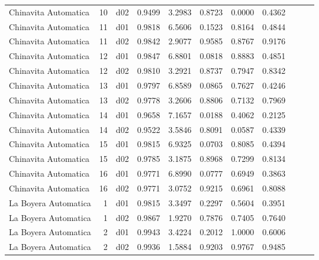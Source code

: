 \begin{landscape}
\begin{longtable}{p{2cm}rrrrrrrrrr}
 Chinavita Automatica  &         10 &     d02 &   0.9499 &  3.2983 &        0.8723 &           0.0000 &  0.4362 \\
 Chinavita Automatica  &         11 &     d01 &   0.9818 &  6.5606 &        0.1523 &           0.8164 &  0.4844 \\
 Chinavita Automatica  &         11 &     d02 &   0.9842 &  2.9077 &        0.9585 &           0.8767 &  0.9176 \\
 Chinavita Automatica  &         12 &     d01 &   0.9847 &  6.8801 &        0.0818 &           0.8883 &  0.4851 \\
 Chinavita Automatica  &         12 &     d02 &   0.9810 &  3.2921 &        0.8737 &           0.7947 &  0.8342 \\
 Chinavita Automatica  &         13 &     d01 &   0.9797 &  6.8589 &        0.0865 &           0.7627 &  0.4246 \\
 Chinavita Automatica  &         13 &     d02 &   0.9778 &  3.2606 &        0.8806 &           0.7132 &  0.7969 \\
 Chinavita Automatica  &         14 &     d01 &   0.9658 &  7.1657 &        0.0188 &           0.4062 &  0.2125 \\
 Chinavita Automatica  &         14 &     d02 &   0.9522 &  3.5846 &        0.8091 &           0.0587 &  0.4339 \\
 Chinavita Automatica  &         15 &     d01 &   0.9815 &  6.9325 &        0.0703 &           0.8085 &  0.4394 \\
 Chinavita Automatica  &         15 &     d02 &   0.9785 &  3.1875 &        0.8968 &           0.7299 &  0.8134 \\
 Chinavita Automatica  &         16 &     d01 &   0.9771 &  6.8990 &        0.0777 &           0.6949 &  0.3863 \\
 Chinavita Automatica  &         16 &     d02 &   0.9771 &  3.0752 &        0.9215 &           0.6961 &  0.8088 \\
 La Boyera Automatica  &          1 &     d01 &   0.9815 &  3.3497 &        0.2297 &           0.5604 &  0.3951 \\
 La Boyera Automatica  &          1 &     d02 &   0.9867 &  1.9270 &        0.7876 &           0.7405 &  0.7640 \\
 La Boyera Automatica  &          2 &     d01 &   0.9943 &  3.4224 &        0.2012 &           1.0000 &  0.6006 \\
 La Boyera Automatica  &          2 &     d02 &   0.9936 &  1.5884 &        0.9203 &           0.9767 &  0.9485 \\

\end{longtable}
\end{landscape}
